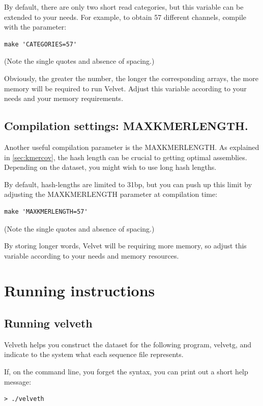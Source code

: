 \documentclass{article}
\begin{document}
By default, there are only two short read categories, but this variable can be extended to your needs. For example, to obtain 57 different channels, compile with the parameter:

\begin{verbatim}
make 'CATEGORIES=57'
\end{verbatim}

(Note the single quotes and absence of spacing.)

Obviously, the greater the number, the longer the corresponding arrays, the more memory will be required to run Velvet. Adjust this variable according to your needs and your memory requirements. 

\subsection{Compilation settings: MAXKMERLENGTH.}

\label{sec:maxlength}

Another useful compilation parameter is the MAXKMERLENGTH. As explained in \ref{sec:kmercov}, the hash length can be crucial to getting optimal assemblies. Depending on the dataset, you might wish to use long hash lengths. 

By default, hash-lengths are limited to 31bp, but you can push up this limit by adjusting the MAXKMERLENGTH parameter at compilation time:

\begin{verbatim}
make 'MAXKMERLENGTH=57'
\end{verbatim}

(Note the single quotes and absence of spacing.)

By storing longer words, Velvet will be requiring more memory, so adjust this variable according to your needs and memory resources. 

\section{Running instructions}

\subsection{Running velveth}

Velveth helps you construct the dataset for the following program, velvetg, and indicate to the system what  each sequence file represents.

If, on the command line, you forget the syntax, you can print out a short help message:
\begin{verbatim}
> ./velveth
\end{verbatim}
\end{document}
